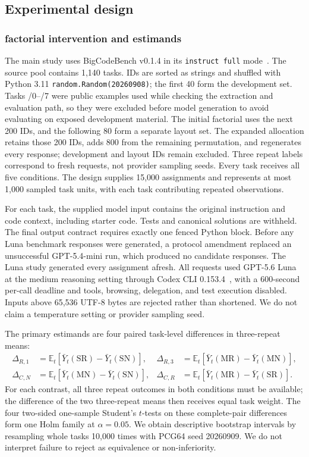 \documentclass[10pt,letterpaper]{article}
\begin{document}
\subsection*{Experimental design}
\subsubsection*{factorial intervention and estimands}
The main study uses BigCodeBench v0.1.4 in its \texttt{instruct full} mode~\cite{zhuo2024bigcodebench}. The source pool contains 1,140 tasks. IDs are sorted as strings and shuffled with Python 3.11 \texttt{random.Random(20260908)}; the first 40 form the development set. Tasks /0--/7 were public examples used while checking the extraction and evaluation path, so they were excluded before model generation to avoid evaluating on exposed development material. The initial factorial uses the next 200 IDs, and the following 80 form a separate layout set. The expanded allocation retains those 200 IDs, adds 800 from the remaining permutation, and regenerates every response; development and layout IDs remain excluded. Three repeat labels correspond to fresh requests, not provider sampling seeds. Every task receives all five conditions. The design supplies 15,000 assignments and represents at most 1,000 sampled task units, with each task contributing repeated observations.

For each task, the supplied model input contains the original instruction and code context, including starter code. Tests and canonical solutions are withheld. The final output contract requires exactly one fenced Python block. Before any Luna benchmark responses were generated, a protocol amendment replaced an unsuccessful GPT-5.4-mini run, which produced no candidate responses. The Luna study generated every assignment afresh. All requests used GPT-5.6 Luna at the medium reasoning setting through Codex CLI 0.153.4~\cite{openai56luna2026,codexexec2026}, with a 600-second per-call deadline and tools, browsing, delegation, and test execution disabled. Inputs above 65,536 UTF-8 bytes are rejected rather than shortened. We do not claim a temperature setting or provider sampling seed.

The primary estimands are four paired task-level differences in three-repeat means:
\begin{align}
\Delta_{R,1}&=\mathbb{E}_t[\bar Y_t(\mathrm{SR})-\bar Y_t(\mathrm{SN})], &
\Delta_{R,3}&=\mathbb{E}_t[\bar Y_t(\mathrm{MR})-\bar Y_t(\mathrm{MN})],\\
\Delta_{C,N}&=\mathbb{E}_t[\bar Y_t(\mathrm{MN})-\bar Y_t(\mathrm{SN})], &
\Delta_{C,R}&=\mathbb{E}_t[\bar Y_t(\mathrm{MR})-\bar Y_t(\mathrm{SR})].
\end{align}
For each contrast, all three repeat outcomes in both conditions must be available; the difference of the two three-repeat means then receives equal task weight. The four two-sided one-sample Student's $t$-tests on these complete-pair differences form one Holm family at $\alpha=0.05$. We obtain descriptive bootstrap intervals by resampling whole tasks 10,000 times with PCG64 seed 20260909. We do not interpret failure to reject as equivalence or non-inferiority.
\end{document}
